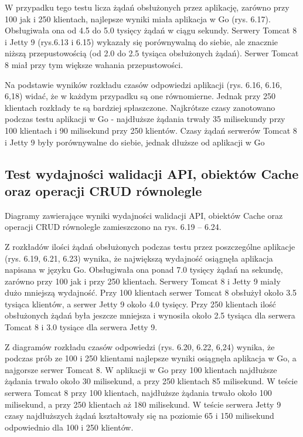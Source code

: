 W przypadku tego testu licza żądań obsłużonych przez aplikację, zarówno przy 100 jak i 250 klientach, najlepsze wyniki miała aplikacja w Go (rys. 6.17). Obsługiwała ona od 4.5 do 5.0 tysięcy żądań w ciągu sekundy. Serwery Tomcat 8 i Jetty 9 (rys.6.13 i 6.15) wykazały się porównywalną do siebie, ale znacznie niższą przepustowością (od 2.0 do 2.5 tysiąca obsłużonych żądań). Serwer Tomcat 8 miał przy tym  większe wahania przepustowości.  

Na podstawie wyników rozkładu czasów odpowiedzi aplikacji (rys. 6.16, 6.16, 6,18)  widać,  że w każdym przypadku są one równomierne. Jednak przy 250 klientach rozkłady te są bardziej spłaszczone. Najkrótsze czasy zanotowano podczas testu aplikacji w Go - najdłuższe  żądania trwały 35 milisekundy przy 100 klientach i 90 milisekund przy 250 klientów. Czasy żądań serwerów Tomcat 8 i Jetty 9 były porównywalne do siebie, jednak dłuższe od aplikacji w Go


\clearpage

\subsection{Test wydajności walidacji API, obiektów Cache oraz operacji CRUD równolegle}
Diagramy zawierające wyniki wydajności walidacji API, obiektów Cache oraz operacji CRUD równolegle zamieszczono na rys. 6.19 – 6.24.                                                                                            

Z rozkładów ilości żądań obsłużonych podczas testu przez poszczególne aplikacje (rys. 6.19, 6.21, 6.23) wynika, że największą wydajność osiągnęła  aplikacja napisana w języku Go. Obsługiwała ona ponad 7.0 tysięcy żądań na sekundę, zarówno przy 100 jak i przy 250 klientach. Serwery Tomcat 8 i  Jetty 9  miały dużo  mniejszą wydajność. Przy 100 klientach  serwer Tomcat 8 obsłużył około 3.5 tysiąca klientów, a serwer Jetty 9 około 4.0 tysięcy. Przy 250 klientach ilość obsłużonych żądań była jeszcze mniejsza i wynosiła około 2.5 tysiąca dla serwera Tomcat 8 i 3.0 tysiące dla serwera Jetty 9.  

Z diagramów rozkładu czasów odpowiedzi (rys. 6.20, 6.22, 6,24) wynika, że podczas prób ze 100 i 250 klientami najlepsze wyniki osiągnęła aplikacja w Go, a najgorsze  serwer Tomcat 8. W aplikacji w Go przy 100 klientach najdłuższe żądania trwało około 30 milisekund, a  przy 250 klientach 85 milisekund.  W teście serwera Tomcat 8 przy 100 klientach, najdłuższe żądania trwało około 100 milisekund, a przy 250 klientach aż 180 milisekund. W teście serwera Jetty 9  czasy najdłuższych żądań kształtowały się na poziomie 65 i 150 milisekund odpowiednio dla 100 i 250 klientów.

